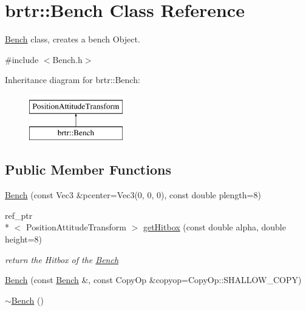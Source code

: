 \hypertarget{classbrtr_1_1_bench}{\section{brtr\+:\+:Bench Class Reference}
\label{classbrtr_1_1_bench}
}


\hyperlink{classbrtr_1_1_bench}{Bench} class, creates a bench Object.  




{\ttfamily \#include $<$Bench.\+h$>$}

Inheritance diagram for brtr\+:\+:Bench\+:\begin{figure}[H]
\begin{center}
\leavevmode
\includegraphics[height=2.000000cm]{classbrtr_1_1_bench}
\end{center}
\end{figure}
\subsection*{Public Member Functions}
\begin{DoxyCompactItemize}
\item 
\hyperlink{classbrtr_1_1_bench_a66ae6f45365c36daeabeed1a4b778d83}{Bench} (const Vec3 \&pcenter=Vec3(0, 0, 0), const double plength=8)
\item 
ref\+\_\+ptr\\*
$<$ Position\+Attitude\+Transform $>$ \hyperlink{classbrtr_1_1_bench_ad59e81ffbe90a7297bd5f256a54a234e}{get\+Hitbox} (const double alpha, double height=8)
\begin{DoxyCompactList}\small\item\em return the Hitbox of the \hyperlink{classbrtr_1_1_bench}{Bench} \end{DoxyCompactList}\item 
\hyperlink{classbrtr_1_1_bench_a9bd8ae1e6e48eb278206eff7102cac23}{Bench} (const \hyperlink{classbrtr_1_1_bench}{Bench} \&, const Copy\+Op \&copyop=Copy\+Op\+::\+S\+H\+A\+L\+L\+O\+W\+\_\+\+C\+O\+P\+Y)
\item 
\hyperlink{classbrtr_1_1_bench_a22ffdb328f6dac6737108d0f7aa34f67}{$\sim$\+Bench} ()
\end{DoxyCompactItemize}
